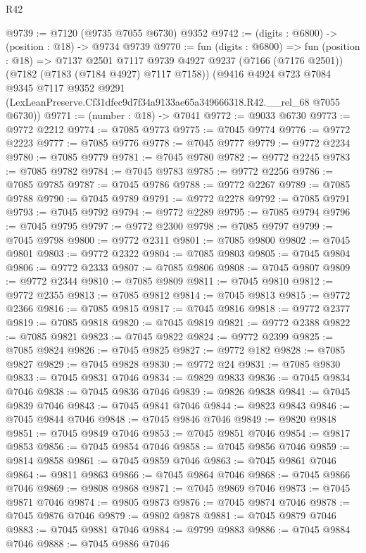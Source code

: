 \begin{lexlean}{R42}
\begin{coremodule}
{@9739 := @7120 (@9735 @7055 @6730) @9352
@9742 := (digits : @6800) -> (position : @18) -> @9734 @9739
@9770 := fun (digits : @6800) =>
  fun (position : @18) =>
  @7137
    @2501
    @7117
    @9739
    @4927
    @9237
    (@7166 (@7176 @2501))
    (@7182 (@7183 (@7184 @4927) @7117 @7158))
    (@9416
      @4924
      @723
      @7084
      @9345
      @7117
      @9352
      @9291
      (LexLeanPreserve.Cf31dfec9d7f34a9133ae65a349666318.R42.__rel_68 @7055 @6730))
@9771 := (number : @18) -> @7041
@9772 := @9033 @6730
@9773 := @9772 @2212
@9774 := @7085 @9773
@9775 := @7045 @9774
@9776 := @9772 @2223
@9777 := @7085 @9776
@9778 := @7045 @9777
@9779 := @9772 @2234
@9780 := @7085 @9779
@9781 := @7045 @9780
@9782 := @9772 @2245
@9783 := @7085 @9782
@9784 := @7045 @9783
@9785 := @9772 @2256
@9786 := @7085 @9785
@9787 := @7045 @9786
@9788 := @9772 @2267
@9789 := @7085 @9788
@9790 := @7045 @9789
@9791 := @9772 @2278
@9792 := @7085 @9791
@9793 := @7045 @9792
@9794 := @9772 @2289
@9795 := @7085 @9794
@9796 := @7045 @9795
@9797 := @9772 @2300
@9798 := @7085 @9797
@9799 := @7045 @9798
@9800 := @9772 @2311
@9801 := @7085 @9800
@9802 := @7045 @9801
@9803 := @9772 @2322
@9804 := @7085 @9803
@9805 := @7045 @9804
@9806 := @9772 @2333
@9807 := @7085 @9806
@9808 := @7045 @9807
@9809 := @9772 @2344
@9810 := @7085 @9809
@9811 := @7045 @9810
@9812 := @9772 @2355
@9813 := @7085 @9812
@9814 := @7045 @9813
@9815 := @9772 @2366
@9816 := @7085 @9815
@9817 := @7045 @9816
@9818 := @9772 @2377
@9819 := @7085 @9818
@9820 := @7045 @9819
@9821 := @9772 @2388
@9822 := @7085 @9821
@9823 := @7045 @9822
@9824 := @9772 @2399
@9825 := @7085 @9824
@9826 := @7045 @9825
@9827 := @9772 @182
@9828 := @7085 @9827
@9829 := @7045 @9828
@9830 := @9772 @24
@9831 := @7085 @9830
@9833 := @7045 @9831 @7046
@9834 := @9829 @9833
@9836 := @7045 @9834 @7046
@9838 := @7045 @9836 @7046
@9839 := @9826 @9838
@9841 := @7045 @9839 @7046
@9843 := @7045 @9841 @7046
@9844 := @9823 @9843
@9846 := @7045 @9844 @7046
@9848 := @7045 @9846 @7046
@9849 := @9820 @9848
@9851 := @7045 @9849 @7046
@9853 := @7045 @9851 @7046
@9854 := @9817 @9853
@9856 := @7045 @9854 @7046
@9858 := @7045 @9856 @7046
@9859 := @9814 @9858
@9861 := @7045 @9859 @7046
@9863 := @7045 @9861 @7046
@9864 := @9811 @9863
@9866 := @7045 @9864 @7046
@9868 := @7045 @9866 @7046
@9869 := @9808 @9868
@9871 := @7045 @9869 @7046
@9873 := @7045 @9871 @7046
@9874 := @9805 @9873
@9876 := @7045 @9874 @7046
@9878 := @7045 @9876 @7046
@9879 := @9802 @9878
@9881 := @7045 @9879 @7046
@9883 := @7045 @9881 @7046
@9884 := @9799 @9883
@9886 := @7045 @9884 @7046
@9888 := @7045 @9886 @7046
}
\end{coremodule}
\end{lexlean}
